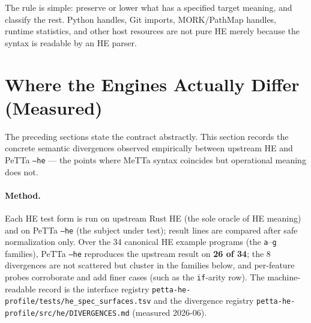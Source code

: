 \documentclass[11pt]{article}
\newcommand{\code}[1]{\texttt{#1}}
\newcommand{\HE}{\textup{HE}}
\newcommand{\PeTTa}{\textup{PeTTa}}
\begin{document}
The rule is simple: preserve or lower what has a specified target meaning, and
classify the rest.  Python handles, Git imports, MORK/PathMap handles, runtime
statistics, and other host resources are not pure \HE{} merely because the
syntax is readable by an \HE{} parser.

\section{Where the Engines Actually Differ (Measured)}

The preceding sections state the contract abstractly.  This section records the
concrete semantic divergences observed empirically between upstream \HE{} and
\PeTTa{} \code{--he} --- the points where MeTTa syntax coincides but operational
meaning does not.

\paragraph{Method.}
Each \HE{} test form is run on upstream Rust \HE{} (the sole oracle of \HE{}
meaning) and on \PeTTa{} \code{--he} (the subject under test); result lines are
compared after safe normalization only.  Over the 34 canonical \HE{} example
programs (the \code{a}--\code{g} families), \PeTTa{} \code{--he} reproduces the
upstream result on \textbf{26 of 34}; the 8 divergences are not scattered but
cluster in the families below, and per-feature probes corroborate and add finer
cases (such as the \code{if}-arity row).  The machine-readable record is the
interface registry \code{petta-he-profile/tests/he\_spec\_surfaces.tsv} and the
divergence registry \code{petta-he-profile/src/he/DIVERGENCES.md} (measured
2026-06).
\end{document}

